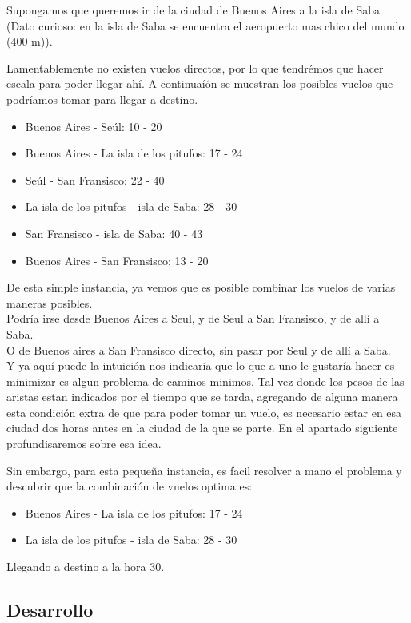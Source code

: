 Supongamos que queremos ir de la ciudad de Buenos Aires a la isla de Saba (Dato curioso: en la isla de Saba se encuentra el aeropuerto mas chico del mundo (400 m)).

Lamentablemente no existen vuelos directos, por lo que tendrémos que hacer escala para poder llegar ahí. A continuaíón se muestran los posibles vuelos que podríamos tomar para llegar a destino.

\begin{itemize}
\item Buenos Aires - Seúl: 10 - 20
\item Buenos Aires - La isla de los pitufos: 17 - 24
\item Seúl - San Fransisco: 22 - 40
\item La isla de los pitufos - isla de Saba: 28 - 30
\item San Fransisco - isla de Saba: 40 - 43
\item Buenos Aires - San Fransisco: 13 - 20
\end{itemize}

De esta simple instancia, ya vemos que es posible combinar los vuelos de varias maneras posibles.
\\
Podría irse desde Buenos Aires a Seul, y de Seul a San Fransisco, y de allí a Saba.
\\
O de Buenos aires a San Fransisco directo, sin pasar por Seul y de allí a Saba.
\\
Y ya aquí puede la intuición nos indicaría que lo que a uno le gustaría hacer es minimizar es algun problema de caminos minimos. Tal vez donde los pesos de las aristas estan indicados por el tiempo que se tarda, agregando de alguna manera esta condición extra de que para poder tomar un vuelo, es necesario estar en esa ciudad dos horas antes en la ciudad de la que se parte. En el apartado siguiente profundisaremos sobre esa idea.

Sin embargo, para esta pequeña instancia, es facil resolver a mano el problema y descubrir que la combinación de vuelos optima es:

\begin{itemize}
\item Buenos Aires - La isla de los pitufos: 17 - 24
\item La isla de los pitufos - isla de Saba: 28 - 30
\end{itemize}

Llegando a destino a la hora $30$.

\subsection{Desarrollo}

